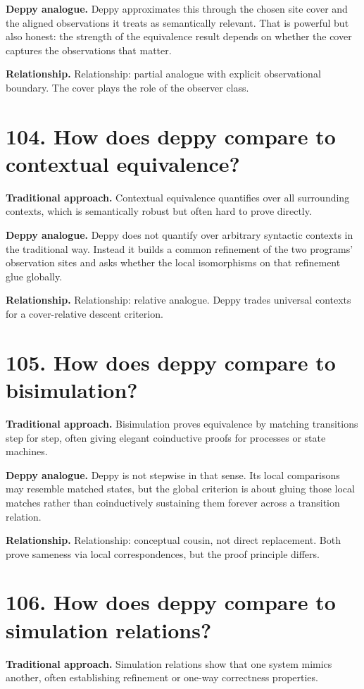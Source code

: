\documentclass[11pt,openany]{book}
\begin{document}
\textbf{Deppy analogue.} Deppy approximates this through the chosen site cover and the aligned observations it treats as semantically relevant. That is powerful but also honest: the strength of the equivalence result depends on whether the cover captures the observations that matter.

\textbf{Relationship.} Relationship: partial analogue with explicit observational boundary. The cover plays the role of the observer class.

\section*{104. How does deppy compare to contextual equivalence?}
\textbf{Traditional approach.} Contextual equivalence quantifies over all surrounding contexts, which is semantically robust but often hard to prove directly.

\textbf{Deppy analogue.} Deppy does not quantify over arbitrary syntactic contexts in the traditional way. Instead it builds a common refinement of the two programs' observation sites and asks whether the local isomorphisms on that refinement glue globally.

\textbf{Relationship.} Relationship: relative analogue. Deppy trades universal contexts for a cover-relative descent criterion.

\section*{105. How does deppy compare to bisimulation?}
\textbf{Traditional approach.} Bisimulation proves equivalence by matching transitions step for step, often giving elegant coinductive proofs for processes or state machines.

\textbf{Deppy analogue.} Deppy is not stepwise in that sense. Its local comparisons may resemble matched states, but the global criterion is about gluing those local matches rather than coinductively sustaining them forever across a transition relation.

\textbf{Relationship.} Relationship: conceptual cousin, not direct replacement. Both prove sameness via local correspondences, but the proof principle differs.

\section*{106. How does deppy compare to simulation relations?}
\textbf{Traditional approach.} Simulation relations show that one system mimics another, often establishing refinement or one-way correctness properties.
\end{document}

